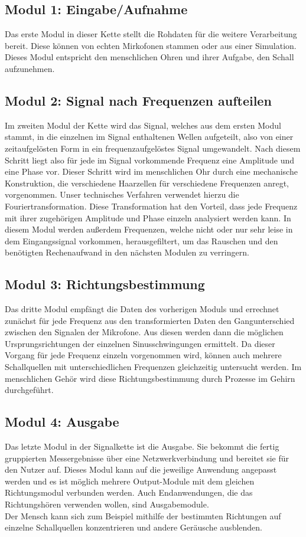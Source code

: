 \subsection{Modul 1: Eingabe/Aufnahme\label{sec:module1}}
Das erste Modul in dieser Kette stellt die Rohdaten für die weitere Verarbeitung bereit. Diese können von echten Mirkofonen stammen oder aus einer Simulation. Dieses Modul entspricht den menschlichen Ohren und ihrer Aufgabe, den Schall aufzunehmen.

\subsection{Modul 2: Signal nach Frequenzen aufteilen}
Im zweiten Modul der Kette wird das Signal, welches aus dem ersten Modul stammt, in die einzelnen im Signal enthaltenen Wellen aufgeteilt, also von einer zeitaufgelösten Form in ein frequenzaufgelöstes Signal umgewandelt. Nach diesem Schritt liegt also für jede im Signal vorkommende Frequenz eine Amplitude und eine Phase vor. Dieser Schritt wird im menschlichen Ohr durch eine mechanische Konstruktion, die verschiedene Haarzellen für verschiedene Frequenzen anregt, vorgenommen. Unser technisches Verfahren verwendet hierzu die Fouriertransformation. Diese Transformation hat den Vorteil, dass jede Frequenz mit ihrer zugehörigen Amplitude und Phase einzeln analysiert werden kann.
In diesem Modul werden außerdem Frequenzen, welche nicht oder nur sehr leise in dem Eingangssignal vorkommen, herausgefiltert, um das Rauschen und den benötigten Rechenaufwand in den nächsten Modulen zu verringern.

\subsection{Modul 3: Richtungsbestimmung}
Das dritte Modul empfängt die Daten des vorherigen Moduls und errechnet zunächst für jede Frequenz aus den transformierten Daten den Gangunterschied zwischen den Signalen der Mikrofone. Aus diesen werden dann die möglichen Ursprungsrichtungen der einzelnen Sinusschwingungen ermittelt. Da dieser Vorgang für jede Frequenz einzeln vorgenommen wird, können auch mehrere Schallquellen mit unterschiedlichen Frequenzen gleichzeitig untersucht werden. Im menschlichen Gehör wird diese Richtungsbestimmung durch Prozesse im Gehirn durchgeführt.

\subsection{Modul 4: Ausgabe\label{sec:module4}}
Das letzte Modul in der Signalkette ist die Ausgabe. Sie bekommt die fertig gruppierten Messergebnisse über eine Netzwerkverbindung und bereitet sie für den Nutzer auf. Dieses Modul kann auf die jeweilige Anwendung angepasst werden und es ist möglich mehrere Output-Module mit dem gleichen Richtungsmodul verbunden werden. Auch Endanwendungen, die das Richtungshören verwenden wollen, sind Ausgabemodule.\\
Der Mensch kann sich zum Beispiel mithilfe der bestimmten Richtungen auf einzelne Schallquellen konzentrieren und andere Geräusche ausblenden.